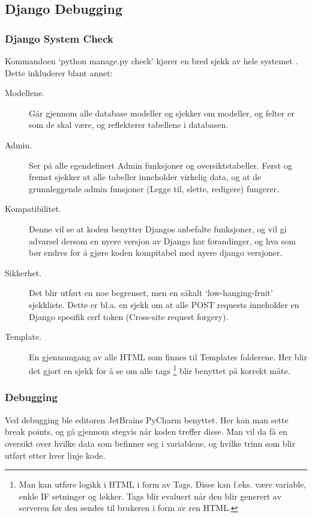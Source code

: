 \subsection{Django Debugging}


\subsubsection{Django System Check}
Kommandoen ‘python manage.py check’ kjører en bred sjekk av hele systemet \cite{tests:django}. Dette inkluderer blant annet:
\begin{description}
\item[Modellene.]Går gjennom alle database modeller og sjekker om modeller, og felter er som de skal være, og reflekterer tabellene i databasen.
\item[Admin.]Ser på alle egendefinert Admin funksjoner og oversiktstabeller. Først og fremst sjekker at alle tabeller inneholder virkelig data, og at de grunnleggende admin funsjoner (Legge til, slette, redigere) fungerer.
\item[Kompatibilitet.]Denne vil se at koden benytter Djangos anbefalte funksjoner, og vil gi advarsel dersom en nyere versjon av Django har forandinger, og hva som bør endres for å gjøre koden kompitabel med nyere django versjoner.
\item[Sikkerhet.]Det blir utført en noe begrenset, men en såkalt ‘low-hanging-fruit’ sjekkliste. Dette er bl.a. en sjekk om at alle POST requests inneholder en Django spesifik csrf token (Cross-site request forgery).
\item[Template.]En gjennomgang av alle HTML som finnes til Templates folderene. Her blir det gjort en sjekk for å se om alle tags \footnote{Man kan utføre logikk i HTML i form av Tags. Disse kan f.eks. være variable, enkle IF setninger og løkker. Tags blir evaluert når den blir generert av serveren før den sendes til brukeren i form av ren HTML.\cite{django:tags}} blir benyttet på korrekt måte.
\end{description}

\subsubsection*{Debugging}
Ved debugging ble editoren JetBrains PyCharm benyttet. Her kan man sette break points, og gå gjennom stegvis når koden treffer disse. Man vil da få en oversikt over hvilke data som befinner seg i variablene, og hvilke trinn som blir utført etter hver linje kode.

